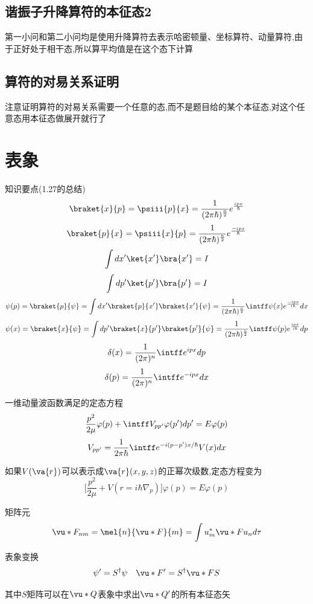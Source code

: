         \subsection{谐振子升降算符的本征态2}
            第一小问和第二小问均是使用升降算符去表示哈密顿量、坐标算符、动量算符,由于正好处于相干态,所以算平均值是在这个态下计算
        
        \subsection{算符的对易关系证明}
            注意证明算符的对易关系需要一个任意的态,而不是题目给的某个本征态,对这个任意态用本征态做展开就行了
        

        

    \section{表象}
            \begin{formal}
                知识要点(1.27的总结)
                $$ \braket{x}{p} = \psiii{p}{x} = \frac{1}{(2 \pi \hbar)^{\frac{n}{2}}} e^{\frac{ipx}{\hbar}} $$ 
                $$ \braket{p}{x} = \psiii{x}{p} = \frac{1}{(2 \pi \hbar)^{\frac{n}{2}}} e^{\frac{-ipx}{\hbar}} $$ 
                $$ \int dx' \ket{x'} \bra{x'} = I $$ 
                $$ \int dp' \ket{p'} \bra{p'} = I $$ 
                $$ \psi(p) = \braket{p}{\psi} = \int dx' \braket{p}{x'} \braket{x'}{\psi} = \frac{1}{(2 \pi \hbar)^{\frac{n}{2}}} \intff \psi(x) e^{\frac{-ipx}{i\hbar}} dx $$
                $$ \psi(x) = \braket{x}{\psi} = \int dp' \braket{x}{p'} \braket{p'}{\psi} = \frac{1}{(2 \pi \hbar)^{\frac{n}{2}}} \intff \psi(p) e^{\frac{ipx}{i\hbar}}  dp $$
                $$ \delta(x) = \frac{1}{(2\pi)^{n}} \intff e^{ipx} dp $$
                $$ \delta(p) = \frac{1}{(2\pi)^{n}} \intff e^{-ipx} dx $$

                一维动量波函数满足的定态方程
                $$ \frac{p^{2}}{2\mu} \varphi(p) + \intff V_{pp'} \varphi(p') dp' = E\varphi(p) $$
                $$ V_{pp'} = \frac{1}{2\pi \hbar} \intff e^{-i(p-p')x/\hbar} V(x)dx $$
                
                如果$V(\va{r})$可以表示成$\va{r}(x,y,z)$的正幂次级数,定态方程变为
                $$ \big[\frac{p^{2}}{2\mu}+V(r=i\hbar \nabla_{p})\big]\varphi(p) = E\varphi(p) $$

                

                矩阵元
                $$ \vu*{F}_{nm} = \mel{n}{\vu*{F}}{m} = \int u^{*}_{m} \vu*{F} u_{n} d\tau  $$

                表象变换
                $$ \psi' = S^{\dagger} \psi \quad \vu*{F}' = S^{\dagger} \vu*{F} S $$

                其中$S$矩阵可以在$\vu*{Q}$表象中求出$\vu*{Q}'$的所有本征态矢



            \end{formal}
        
